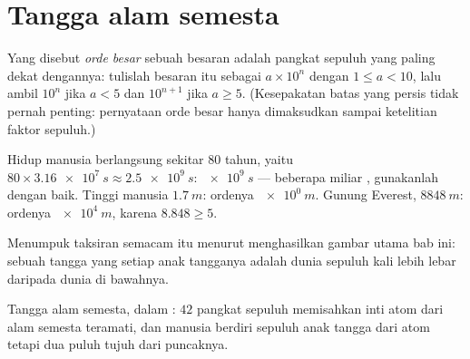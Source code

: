 \section{Tangga alam semesta}

\begin{definition}\label{def:g10:orders-of-magnitude:oom}
Yang disebut \emph{orde besar} sebuah besaran adalah
pangkat sepuluh yang paling dekat dengannya: tulislah besaran itu
sebagai $a \times 10^{n}$ dengan $1 \leq a < 10$, lalu ambil $10^{n}$
jika $a < 5$ dan $10^{n+1}$ jika $a \geq 5$. (Kesepakatan batas yang
persis tidak pernah penting: pernyataan orde besar hanya dimaksudkan
sampai ketelitian faktor sepuluh.)
\end{definition}

\begin{example}\label{ex:g10:orders-of-magnitude:oom}
Hidup manusia berlangsung sekitar $80$ tahun, yaitu
$80 \times \qty{3.16e7}{s} \approx \qty{2.5e9}{s}$: 
$\qty{e9}{s}$ --- beberapa miliar , gunakanlah dengan baik. Tinggi
manusia $\qty{1.7}{m}$: ordenya $\qty{e0}{m}$. Gunung Everest,
$\qty{8848}{m}$: ordenya $\qty{e4}{m}$, karena $8.848 \geq 5$.
\end{example}

Menumpuk taksiran semacam itu menurut  menghasilkan gambar
utama bab ini: sebuah tangga yang setiap anak tangganya adalah dunia
sepuluh kali lebih lebar daripada dunia di bawahnya.

\begin{omfigure}

{\small Tangga alam semesta, dalam : $42$ pangkat sepuluh
memisahkan inti atom dari alam semesta teramati, dan manusia berdiri
sepuluh anak tangga dari atom tetapi dua puluh tujuh dari puncaknya.}
\end{omfigure}

